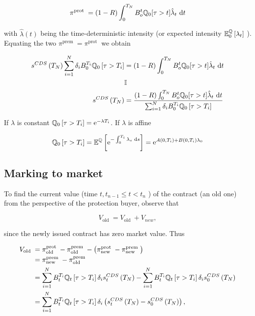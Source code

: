 $$
\pi^{\text {prot }}=(1-R) \int_{0}^{T_{N}} B_{o}^{t} \mathbb{Q}_{0}[\tau>t] \hat{\lambda}_{t} \text{ d}  t
$$

with $\hat{\lambda}(t)$ being the time-deterministic intensity (or expected intensity $\mathbb{E}_{0}^{\mathbb{Q}}\left[\lambda_{t}\right]$ ).\\
Equating the two $\pi^{\text {prem }}=\pi^{\text {prot }}$ we obtain

$$
\begin{aligned}
s^{C D S}\left(T_{N}\right) \sum_{i=1}^{N} \delta_{i} B_{0}^{T_{i}} \mathbb{Q}_{0}\left[\tau>T_{i}\right] & =(1-R) \int_{0}^{T_{N}} B_{o}^{t} \mathbb{Q}_{0}[\tau>t] \hat{\lambda}_{t} \text{ d}  t \\
& \mathbb{I} \\
s^{C D S}\left(T_{N}\right) & =\frac{(1-R) \int_{0}^{T_{N}} B_{o}^{t} \mathbb{Q}_{0}[\tau>t] \hat{\lambda}_{t} \text{ d}  t}{\sum_{i=1}^{N} \delta_{i} B_{0}^{T_{i}} \mathbb{Q}_{0}\left[\tau>T_{i}\right]}
\end{aligned}
$$

If $\lambda$ is constant $\mathbb{Q}_{0}\left[\tau>T_{i}\right]=\mathrm{e}^{-\lambda T_{i}}$. If $\lambda$ is affine

$$
\mathbb{Q}_{0}\left[\tau>T_{i}\right]=\mathbb{E}^{\mathbb{Q}}\left[\mathrm{e}^{-\int_{0}^{T_{i}} \lambda_{s} \text{ d}  s}\right]=\mathrm{e}^{A\left(0, T_{i}\right)+B\left(0, T_{i}\right) \lambda_{0}}
$$

\subsection{Marking to market}
To find the current value (time $t, t_{n-1} \leq t<t_{n}$ ) of the contract (an old one) from the perspective of the protection buyer, observe that

$$
V_{\text {old }}=V_{\text {old }}+V_{n e w},
$$

since the newly issued contract has zero market value. Thus

$$
\begin{aligned}
V_{\text {old }} & =\pi_{\text {old }}^{\text {prot }}-\pi_{\text {old }}^{\text {prem }}-\left(\pi_{\text {new }}^{\text {prot }}-\pi_{\text {new }}^{\text {prem }}\right) \\
& =\pi_{\text {new }}^{\text {prem }}-\pi_{\text {old }}^{\text {prem }} \\
& =\sum_{i=1}^{N} B_{t}^{T_{i}} \mathbb{Q}_{t}\left[\tau>T_{i}\right] \delta_{i} s_{t}^{C D S}\left(T_{N}\right)-\sum_{i=1}^{N} B_{t}^{T_{i}} \mathbb{Q}_{t}\left[\tau>T_{i}\right] \delta_{i} s_{0}^{C D S}\left(T_{N}\right) \\
& =\sum_{i=1}^{N} B_{t}^{T_{i}} \mathbb{Q}_{t}\left[\tau>T_{i}\right] \delta_{i}\left(s_{t}^{C D S}\left(T_{N}\right)-s_{0}^{C D S}\left(T_{N}\right)\right),
\end{aligned}
$$

